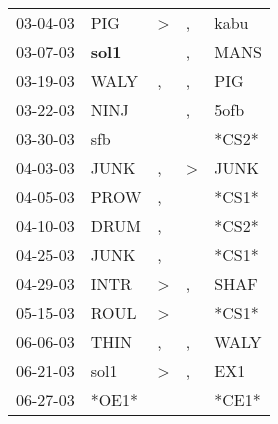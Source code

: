 \begin{supertabular}{p{0.07\textwidth}p{0.06\textwidth}p{0.02\textwidth}p{0.02\textwidth}p{0.06\textwidth}}
          03-04-03\textsuperscript{} &            PIG\textsuperscript{} &     \textgreater &                , &           kabu\textsuperscript{} \\
          03-07-03\textsuperscript{} &  \textbf{sol1\textsuperscript{}} &                  &                , &           MANS\textsuperscript{} \\
          03-19-03\textsuperscript{} &           WALY\textsuperscript{} &                , &                , &            PIG\textsuperscript{} \\
          03-22-03\textsuperscript{} &           NINJ\textsuperscript{} &                  &                , &           5ofb\textsuperscript{} \\
          03-30-03\textsuperscript{} &            sfb\textsuperscript{} &                  &                  &                            *CS2* \\
          04-03-03\textsuperscript{} &           JUNK\textsuperscript{} &                , &     \textgreater &           JUNK\textsuperscript{} \\
          04-05-03\textsuperscript{} &           PROW\textsuperscript{} &                , &                  &                            *CS1* \\
          04-10-03\textsuperscript{} &           DRUM\textsuperscript{} &                , &                  &                            *CS2* \\
          04-25-03\textsuperscript{} &           JUNK\textsuperscript{} &                , &                  &                            *CS1* \\
          04-29-03\textsuperscript{} &           INTR\textsuperscript{} &     \textgreater &                , &           SHAF\textsuperscript{} \\
          05-15-03\textsuperscript{} &           ROUL\textsuperscript{} &     \textgreater &                  &                            *CS1* \\
          06-06-03\textsuperscript{} &           THIN\textsuperscript{} &                , &                , &           WALY\textsuperscript{} \\
          06-21-03\textsuperscript{} &           sol1\textsuperscript{} &     \textgreater &                , &            EX1\textsuperscript{} \\
          06-27-03\textsuperscript{} &                            *OE1* &                  &                  &                            *CE1* \\

\end{supertabular}
